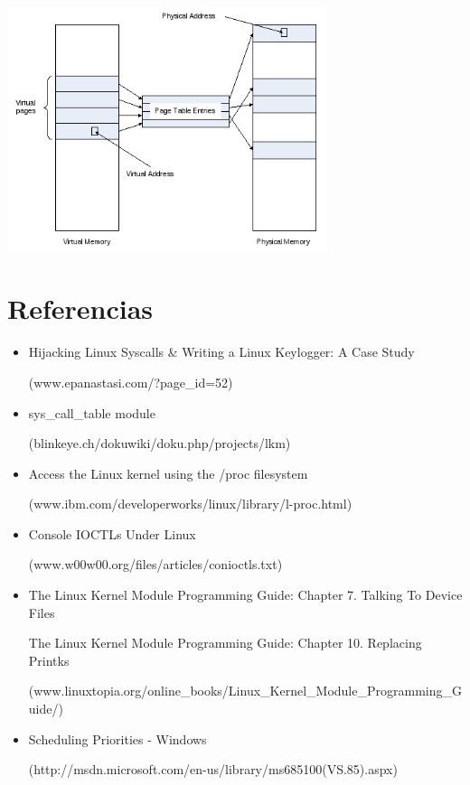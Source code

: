 \documentclass[a4paper,11pt] {article}
\begin{document}
\begin{itemize}
\begin{itemize}
		\begin{center}
		\includegraphics[width=0.7\textwidth]{virtual.png}
		\end{center}
	\end{itemize}

\end{itemize}

\section*{Referencias}
\begin{itemize}
 	\item Hijacking Linux Syscalls \& Writing a Linux Keylogger: A Case Study 

	(www.epanastasi.com/?page\_id=52)
	\item sys\_call\_table module 

	(blinkeye.ch/dokuwiki/doku.php/projects/lkm)
	\item Access the Linux kernel using the /proc filesystem 

	(www.ibm.com/developerworks/linux/library/l-proc.html)
	\item Console IOCTLs Under Linux 

	(www.w00w00.org/files/articles/conioctls.txt)
	\item 	The Linux Kernel Module Programming Guide: Chapter 7. Talking To Device Files

			The Linux Kernel Module Programming Guide: Chapter 10. Replacing Printks

			(www.linuxtopia.org/online\_books/Linux\_Kernel\_Module\_Programming\_Guide/)

	\item Scheduling Priorities - Windows 

			(http://msdn.microsoft.com/en-us/library/ms685100(VS.85).aspx)

\end{itemize}
\end{document}
